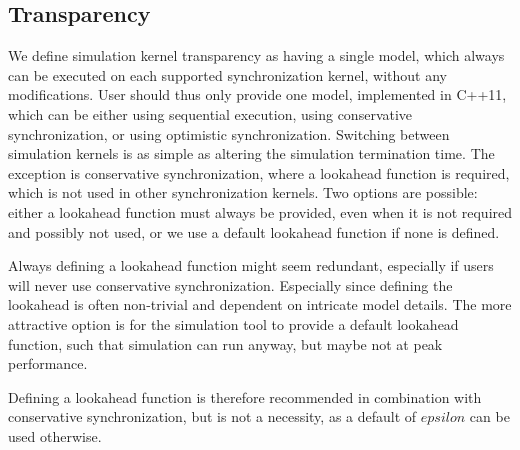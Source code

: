 \subsection{Transparency}
We define simulation kernel transparency as having a single model, which always can be executed on each supported synchronization kernel, without any modifications.
User should thus only provide one model, implemented in C++11, which can be either using sequential execution, using conservative synchronization, or using optimistic synchronization.
Switching between simulation kernels is as simple as altering the simulation termination time.
The exception is conservative synchronization, where a lookahead function is required, which is not used in other synchronization kernels.
Two options are possible: either a lookahead function must always be provided, even when it is not required and possibly not used, or we use a default lookahead function if none is defined.

Always defining a lookahead function might seem redundant, especially if users will never use conservative synchronization.
Especially since defining the lookahead is often non-trivial and dependent on intricate model details.
The more attractive option is for the simulation tool to provide a default lookahead function, such that simulation can run anyway, but maybe not at peak performance.

Defining a lookahead function is therefore recommended in combination with conservative synchronization, but is not a necessity, as a default of $epsilon$ can be used otherwise.
